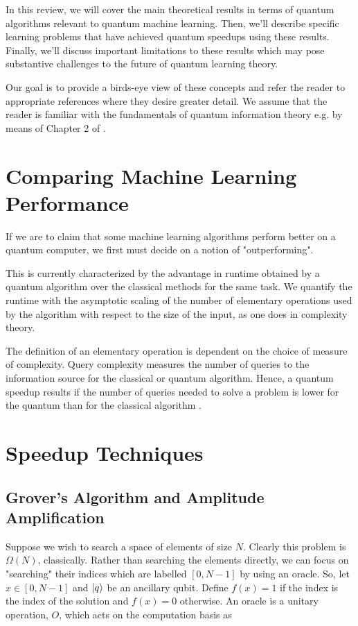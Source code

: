\documentclass[12]{amsart}
\newcommand\0{\mathbf{0}}
\newcommand\<{\langle}
\renewcommand\>{\rangle}
\begin{document}
In this review, we will cover the main theoretical results in terms of quantum algorithms relevant to quantum machine learning. Then, we'll describe specific learning problems that have achieved quantum speedups using these results. Finally, we'll discuss important limitations to these results which may pose substantive challenges to the future of quantum learning theory.

Our goal is to provide a birds-eye view of these concepts and refer the reader to appropriate references where they desire greater detail. We assume that the reader is familiar with the fundamentals of quantum information theory e.g. by means of Chapter 2 of \cite{nielsen2010quantum}.

\section{Comparing Machine Learning Performance}

If we are to claim that some machine learning algorithms perform better on a quantum computer, we first must decide on a notion of "outperforming". 

This is currently characterized by the advantage in runtime obtained by a quantum algorithm over the classical methods for the same task. We quantify the runtime with the asymptotic scaling of the number of elementary operations used by the algorithm with respect to the size of the input, as one does in complexity theory. 

The definition of an elementary operation is dependent on the choice of measure of complexity. Query complexity measures the number of queries to the information source for the classical or quantum algorithm. Hence, a quantum speedup results if the number of queries needed to solve a problem is lower for the quantum than for the classical algorithm \cite{biamonte2017quantum}.

\section{Speedup Techniques}

\subsection{Grover's Algorithm and Amplitude Amplification}

Suppose we wish to search a space of elements of size $N$. Clearly this problem is $\Omega(N)$, classically. Rather than searching the elements directly, we can focus on "searching" their indices which are labelled $[ 0, N-1]$ by using an oracle. So, let $x \in [0, N-1]$ and $\ket{q}$ be an ancillary qubit. Define $f(x) = 1$ if the index is the index of the solution and $f(x) = 0$ otherwise. An oracle is a unitary operation, $O$, which acts on the computation basis as
\end{document}
